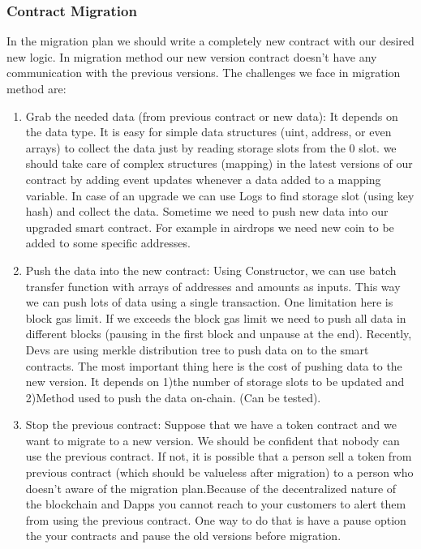\subsubsection{Contract Migration}
In the migration plan we should write a completely new contract with our desired new logic. In migration method our new version contract doesn't have any communication with the previous versions. The challenges we face in migration method are:
\begin{enumerate}
    \item Grab the needed data (from previous contract or new data): 
    It depends on the data type. It is easy for simple data structures (\eg uint, address, or even arrays) to collect the data just by reading storage slots from the 0 slot. we should take care of complex structures (\eg mapping) in the latest versions of our contract by adding event updates whenever a data added to a mapping variable. In case of an upgrade we can use Logs to find storage slot (using key hash) and collect the data.
    Sometime we need to push new data into our upgraded smart contract. For example in airdrops we need new coin to be added to some specific addresses. 
    \item Push the data into the new contract: 
    Using Constructor, we can use batch transfer function with arrays of addresses and amounts as inputs. This way we can push lots of data using a single transaction. One limitation here is block gas limit. If we exceeds the block gas limit we need to push all data in different blocks (pausing in the first block and unpause at the end). Recently, Devs are using merkle distribution tree to push data on to the smart contracts.
    The most important thing here is the cost of pushing data to the new version. It depends on 1)the number of storage slots to be updated and 2)Method used to push the data on-chain. (Can be tested). 
    \item Stop the previous contract:
    Suppose that we have a token contract and we want to migrate to a new version. We should be confident that nobody can use the previous contract. If not, it is possible that a person sell a token from previous contract (which should be valueless after migration) to a person who doesn't aware of the migration plan.Because of the decentralized nature of the blockchain and Dapps you cannot reach to your customers to alert them from using the previous contract. One way to do that is have a pause option the your contracts and pause the old versions before migration.
  \end{enumerate}

